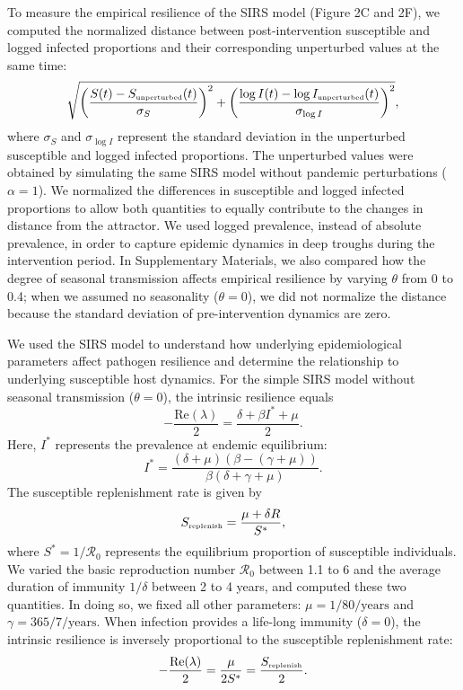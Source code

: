 \documentclass[12pt]{article}
\newcommand{\tsub}[2]{#1_{{\textrm{\tiny #2}}}}
\begin{document}
To measure the empirical resilience of the SIRS model (Figure 2C and 2F), we computed the normalized distance between post-intervention susceptible and logged infected proportions and their corresponding unperturbed values at the same time:
\begin{equation}
\sqrt{\left(\frac{S(t) - \tsub{S}{unperturbed}(t)}{\sigma_S}\right)^2 + \left(\frac{\log I(t) - \log \tsub{I}{unperturbed}(t)}{\sigma_{\log I}}\right)^2},
\end{equation}
where $\sigma_S$ and $\sigma_{\log I}$ represent the standard deviation in the unperturbed susceptible and logged infected proportions.
The unperturbed values were obtained by simulating the same SIRS model without pandemic perturbations ($\alpha = 1$).
We normalized the differences in susceptible and logged infected proportions to allow both quantities to equally contribute to the changes in distance from the attractor.
We used logged prevalence, instead of absolute prevalence, in order to capture epidemic dynamics in deep troughs during the intervention period.
In Supplementary Materials, we also compared how the degree of seasonal transmission affects empirical resilience by varying $\theta$ from 0 to 0.4; when we assumed no seasonality ($\theta = 0$), we did not normalize the distance because the standard deviation of pre-intervention dynamics are zero. 

We used the SIRS model to understand how underlying epidemiological parameters affect pathogen resilience and determine the relationship to underlying susceptible host dynamics.
For the simple SIRS model without seasonal transmission ($\theta = 0$), the intrinsic resilience equals
\begin{equation}
-\frac{\mathrm{Re}(\lambda)}{2} = \frac{\delta + \beta I^{\ast} + \mu}{2}.
\end{equation}
Here, $I^{\ast}$ represents the prevalence at endemic equilibrium:
\begin{equation}
I^{\ast} = \frac{(\delta + \mu)(\beta - (\gamma + \mu))}{\beta(\delta + \gamma + \mu)}.
\end{equation}
The susceptible replenishment rate is given by
\begin{equation}
\tsub{S}{replenish} = \frac{\mu + \delta R}{S^\ast},
\end{equation}
where $S^\ast = 1/\mathcal R_0$ represents the equilibrium proportion of susceptible individuals.
We varied the basic reproduction number $\mathcal R_0$ between 1.1 to 6 and the average duration of immunity $1/\delta$ between 2 to 4 years, and computed these two quantities.
In doing so, we fixed all other parameters: $\mu=1/80/\mathrm{years}$ and $\gamma=365/7/\mathrm{years}$.
When infection provides a life-long immunity ($\delta = 0$), the intrinsic resilience is inversely proportional to the susceptible replenishment rate:
\begin{equation}
-\frac{\mathrm{Re}(\lambda)}{2} = \frac{\mu}{2 S^\ast} = \frac{\tsub{S}{replenish}}{2}.
\end{equation}
\end{document}
